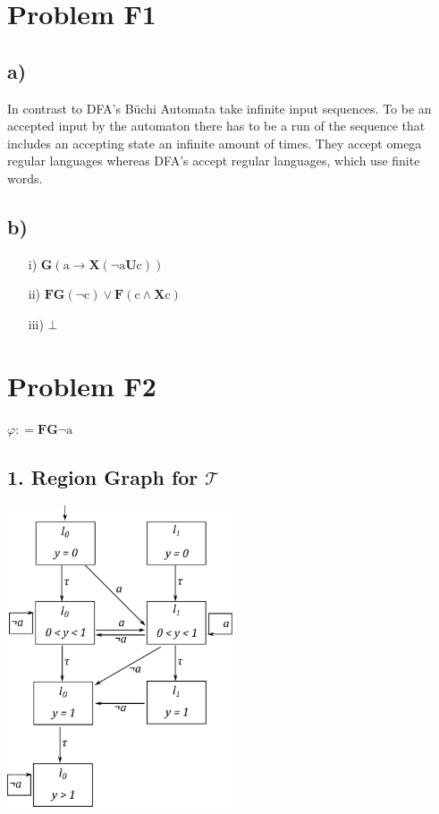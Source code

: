\documentclass[12pt]{article}
\begin{document}
\lstset{language=C++}

\section*{Problem F1}
\subsection*{a)}
In contrast to DFA's Büchi Automata take infinite input sequences. To be an accepted input by the automaton there has to be a run of the sequence that includes an accepting state an infinite amount of times. 
They accept omega regular languages whereas DFA's accept regular languages, which use finite words.

\subsection*{b)}
\begin{itemize}
	\item[i)] $ \mathbf{G}( \text{a} \rightarrow \mathbf{X}(\neg \text{a} \mathbf{U} \text{c} ))$
	\item[ii)] $ \mathbf{F} \mathbf{G} ( \neg \text{c} ) \lor \mathbf{F} (\text{c} \land \mathbf{X} \text{c})  $
	\item[iii)] $ \bot $
\end{itemize}


\section*{Problem F2}

$\varphi : = \mathbf{F} \mathbf{G} \neg \text{a}$
\subsection*{1. Region Graph for $\mathcal{T}$ }

\includegraphics[width=0.5\textwidth]{images/region_graph.pdf}
\end{document}
